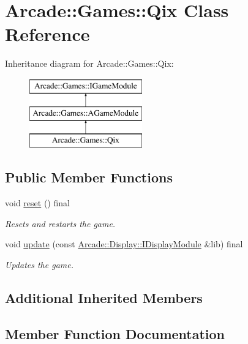 \hypertarget{classArcade_1_1Games_1_1Qix}{}\section{Arcade\+::Games\+::Qix Class Reference}
\label{classArcade_1_1Games_1_1Qix}
Inheritance diagram for Arcade\+::Games\+::Qix\+:\begin{figure}[H]
\begin{center}
\leavevmode
\includegraphics[height=3.000000cm]{classArcade_1_1Games_1_1Qix}
\end{center}
\end{figure}
\subsection*{Public Member Functions}
\begin{DoxyCompactItemize}
\item 
\mbox{\label{classArcade_1_1Games_1_1Qix_a7d3a6ced1c867ee297a5777db3ff1e12}} 
void \mbox{\hyperlink{classArcade_1_1Games_1_1Qix_a7d3a6ced1c867ee297a5777db3ff1e12}{reset}} () final
\begin{DoxyCompactList}\small\item\em Resets and restarts the game. \end{DoxyCompactList}\item 
void \mbox{\hyperlink{classArcade_1_1Games_1_1Qix_aab6bfb0ecf8571da19c4fcbfc9de263e}{update}} (const \mbox{\hyperlink{classArcade_1_1Display_1_1IDisplayModule}{Arcade\+::\+Display\+::\+I\+Display\+Module}} \&lib) final
\begin{DoxyCompactList}\small\item\em Updates the game. \end{DoxyCompactList}\end{DoxyCompactItemize}
\subsection*{Additional Inherited Members}


\subsection{Member Function Documentation}
\mbox{\label{classArcade_1_1Games_1_1Qix_aab6bfb0ecf8571da19c4fcbfc9de263e}} 
